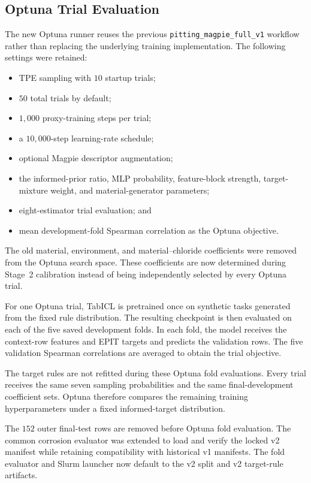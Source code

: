 \documentclass{article}
\begin{document}
\subsection{Optuna Trial Evaluation}
\label{sec:epit-new-optuna}

The new Optuna runner reuses the previous
\texttt{pitting\_magpie\_full\_v1} workflow rather than replacing the
underlying training implementation. The following settings were retained:

\begin{itemize}
    \item TPE sampling with \(10\) startup trials;
    \item \(50\) total trials by default;
    \item \(1{,}000\) proxy-training steps per trial;
    \item a \(10{,}000\)-step learning-rate schedule;
    \item optional Magpie descriptor augmentation;
    \item the informed-prior ratio, MLP probability, feature-block strength,
    target-mixture weight, and material-generator parameters;
    \item eight-estimator trial evaluation; and
    \item mean development-fold Spearman correlation as the Optuna objective.
\end{itemize}

The old material, environment, and material--chloride coefficients were
removed from the Optuna search space. These coefficients are now determined
during Stage~2 calibration instead of being independently selected by every
Optuna trial.

For one Optuna trial, TabICL is pretrained once on synthetic tasks generated
from the fixed rule distribution. The resulting checkpoint is then evaluated
on each of the five saved development folds. In each fold, the model receives
the context-row features and EPIT targets and predicts the validation rows.
The five validation Spearman correlations are averaged to obtain the trial
objective.

The target rules are not refitted during these Optuna fold evaluations. Every
trial receives the same seven sampling probabilities and the same
final-development coefficient sets. Optuna therefore compares the remaining
training hyperparameters under a fixed informed-target distribution.

The \(152\) outer final-test rows are removed before Optuna fold evaluation.
The common corrosion evaluator was extended to load and verify the locked v2
manifest while retaining compatibility with historical v1 manifests.
The fold evaluator and Slurm launcher now default to the v2 split and v2
target-rule artifacts.
\end{document}
